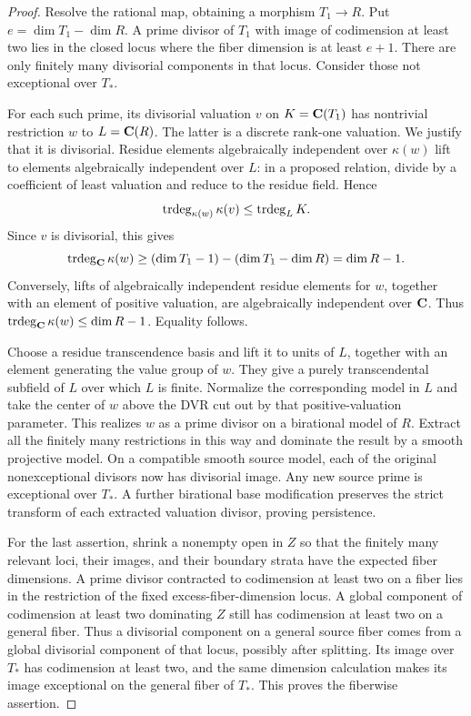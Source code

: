 \begin{proof}
Resolve the rational map, obtaining a morphism $T_1\to R$.  Put
$e=\dim T_1-\dim R$.  A prime divisor of $T_1$ with image of codimension
at least two lies in the closed locus where the fiber dimension is at
least $e+1$.  There are only finitely many divisorial components in that
locus.  Consider those not exceptional over $T_*$.

For each such prime, its divisorial valuation $v$ on
$K=\mathbf C(T_1)$ has nontrivial restriction $w$ to $L=\mathbf C(R)$.  The latter is
a discrete rank-one valuation.  We justify that it is divisorial.
Residue elements algebraically independent over $\kappa(w)$ lift to
elements algebraically independent over $L$: in a proposed relation,
divide by a coefficient of least valuation and reduce to the residue
field.  Hence
\[
 \operatorname{trdeg}_{\kappa(w)}\kappa(v)\le\operatorname{trdeg}_LK.
\]
Since $v$ is divisorial, this gives
\[
 \operatorname{trdeg}_{\mathbf C}\kappa(w)
 \ge (\dim T_1-1)-(\dim T_1-\dim R)=\dim R-1.
\]
Conversely, lifts of algebraically independent residue elements for $w$,
together with an element of positive valuation, are algebraically
independent over $\mathbf C$.  Thus
$\operatorname{trdeg}_{\mathbf C}\kappa(w)\le\dim R-1$.  Equality follows.

Choose a residue transcendence basis and lift it to units of $L$,
together with an element generating the value group of $w$.  They give
a purely transcendental subfield of $L$ over which $L$ is finite.
Normalize the corresponding model in $L$ and take the center of $w$
above the DVR cut out by that positive-valuation parameter.  This
realizes $w$ as a prime divisor on a birational model of $R$.
Extract all the finitely many restrictions in this way and dominate the
result by a smooth projective model.  On a compatible smooth source
model, each of the original nonexceptional divisors now has divisorial
image.  Any new source prime is exceptional over $T_*$.  A further
birational base modification preserves the strict transform of each
extracted valuation divisor, proving persistence.

For the last assertion, shrink a nonempty open in $Z$ so that the
finitely many relevant loci, their images, and their boundary strata
have the expected fiber dimensions.  A prime divisor contracted to
codimension at least two on a fiber lies in the restriction of the
fixed excess-fiber-dimension locus.  A global component of codimension
at least two dominating $Z$ still has codimension at least two on a
general fiber.  Thus a divisorial component on a general source fiber
comes from a global divisorial component of that locus, possibly after
splitting.  Its image over $T_*$ has codimension at least two, and the
same dimension calculation makes its image exceptional on the general
fiber of $T_*$.  This proves the fiberwise assertion.
\end{proof}

